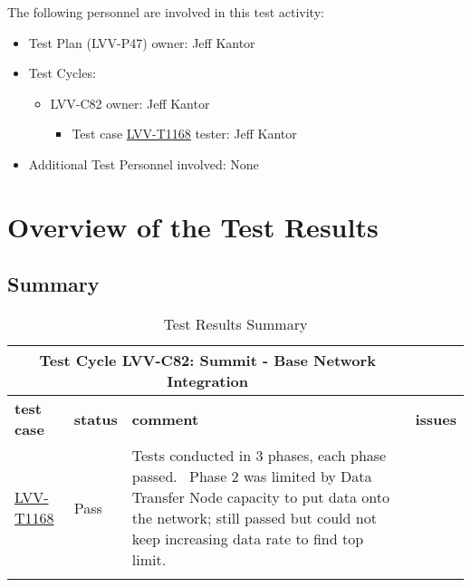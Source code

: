 \documentclass[DM,lsstdraft,STR,toc]{lsstdoc}
\begin{document}
The following personnel are involved in this test activity:

\begin{itemize}
\item Test Plan (LVV-P47) owner: Jeff Kantor
\item Test Cycles:
\begin{itemize}
  \item LVV-C82 owner: 
    Jeff Kantor
  \begin{itemize}
    \item Test case \href{https://jira.lsstcorp.org/secure/Tests.jspa#/testCase/LVV-T1168}{LVV-T1168} tester: Jeff Kantor
  \end{itemize}
\end{itemize}
\item Additional Test Personnel involved: None
\end{itemize}

\newpage

\section{Overview of the Test Results}
\label{sect:overview}

\subsection{Summary}
\label{sect:summarytable}

\begin{longtable}{p{}p{}p{}p{}}
\toprule

  \multicolumn{3}{c}{ Test Cycle {\bf LVV-C82: Summit - Base Network Integration
 }} \\\hline

  {\bf \footnotesize test case} & {\bf \footnotesize status} & {\bf \footnotesize comment} & {\bf \footnotesize issues} \\\toprule

    \href{https://jira.lsstcorp.org/secure/Tests.jspa#/testCase/LVV-T1168}{LVV-T1168}
    & Pass & Tests conducted in 3 phases, each phase passed. ~Phase 2 was limited by
Data Transfer Node capacity to put data onto the network; still passed
but could not keep increasing data rate to find top limit.
 &
    \\\hline

\caption{Test Results Summary}
\label{table:summary}
\end{longtable}
\end{document}
